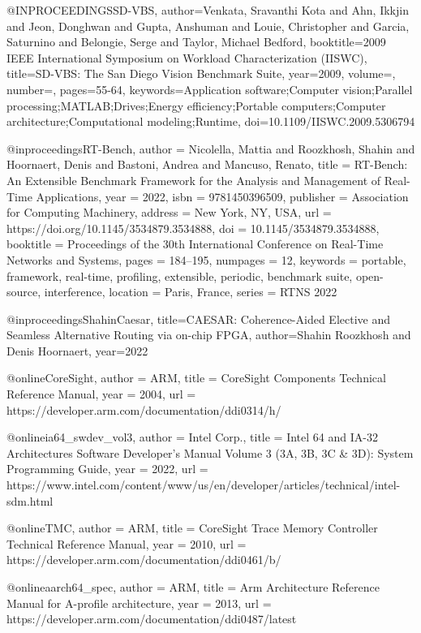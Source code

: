 @INPROCEEDINGS{SD-VBS,
  author={Venkata, Sravanthi Kota and Ahn, Ikkjin and Jeon, Donghwan and Gupta, Anshuman and Louie, Christopher and Garcia, Saturnino and Belongie, Serge and Taylor, Michael Bedford},
  booktitle={2009 IEEE International Symposium on Workload Characterization (IISWC)}, 
  title={SD-VBS: The San Diego Vision Benchmark Suite}, 
  year={2009},
  volume={},
  number={},
  pages={55-64},
  keywords={Application software;Computer vision;Parallel processing;MATLAB;Drives;Energy efficiency;Portable computers;Computer architecture;Computational modeling;Runtime},
  doi={10.1109/IISWC.2009.5306794}}

@inproceedings{RT-Bench,
	author = {Nicolella, Mattia and Roozkhosh, Shahin and Hoornaert, Denis and Bastoni, Andrea and Mancuso, Renato},
	title = {RT-Bench: An Extensible Benchmark Framework for the Analysis and Management of Real-Time Applications},
	year = {2022},
	isbn = {9781450396509},
	publisher = {Association for Computing Machinery},
	address = {New York, NY, USA},
	url = {https://doi.org/10.1145/3534879.3534888},
	doi = {10.1145/3534879.3534888},
	booktitle = {Proceedings of the 30th International Conference on Real-Time Networks and Systems},
	pages = {184–195},
	numpages = {12},
	keywords = {portable, framework, real-time, profiling, extensible, periodic, benchmark suite, open-source, interference},
	location = {Paris, France},
	series = {RTNS 2022}
}


@inproceedings{ShahinCaesar,
  title={CAESAR: Coherence-Aided Elective and Seamless
Alternative Routing via on-chip FPGA},
  author={Shahin Roozkhosh and Denis Hoornaert},
  year={2022}
}



@online{CoreSight,
  author = {ARM},
  title = {CoreSight Components Technical Reference Manual},
  year = 2004,
  url = {https://developer.arm.com/documentation/ddi0314/h/}
}

@online{ia64_swdev_vol3,
  author = {Intel Corp.},
  title = {{Intel 64 and IA-32 Architectures Software Developer’s Manual Volume 3 (3A, 3B, 3C \& 3D): System Programming Guide}},
  year = 2022,
  url = {https://www.intel.com/content/www/us/en/developer/articles/technical/intel-sdm.html}
}

@online{TMC,
  author = {ARM},
  title = {{CoreSight} Trace Memory Controller Technical Reference Manual},
  year = 2010,
  url = {https://developer.arm.com/documentation/ddi0461/b/}
}

@online{aarch64_spec,
  author = {ARM},
  title = {Arm Architecture Reference Manual for A-profile architecture},
  year = 2013,
  url = {https://developer.arm.com/documentation/ddi0487/latest}
}

